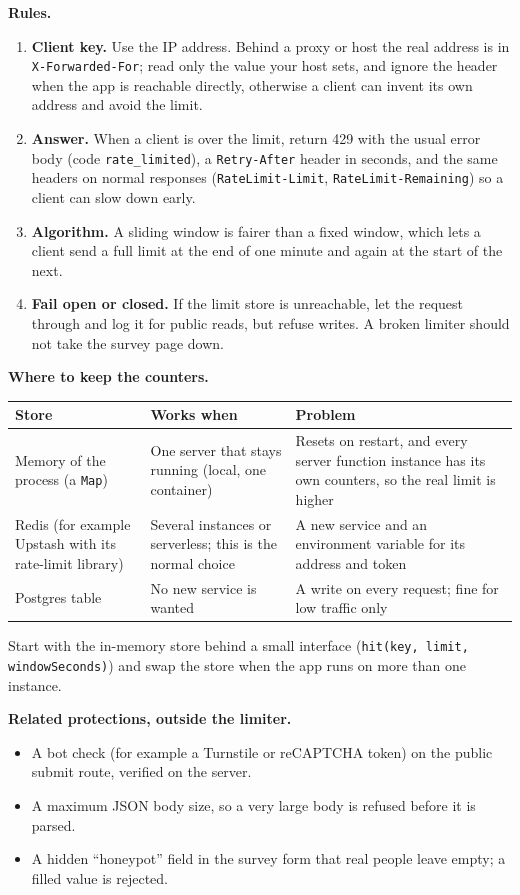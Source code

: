 \documentclass[11pt,a4paper]{article}
\begin{document}
\textbf{Rules.}
\begin{enumerate}
  \item \textbf{Client key.} Use the IP address. Behind a proxy or host the real address is in \texttt{X-Forwarded-For}; read only the value your host sets, and ignore the header when the app is reachable directly, otherwise a client can invent its own address and avoid the limit.
  \item \textbf{Answer.} When a client is over the limit, return 429 with the usual error body (code \texttt{rate\_limited}), a \texttt{Retry-After} header in seconds, and the same headers on normal responses (\texttt{RateLimit-Limit}, \texttt{RateLimit-Remaining}) so a client can slow down early.
  \item \textbf{Algorithm.} A sliding window is fairer than a fixed window, which lets a client send a full limit at the end of one minute and again at the start of the next.
  \item \textbf{Fail open or closed.} If the limit store is unreachable, let the request through and log it for public reads, but refuse writes. A broken limiter should not take the survey page down.
\end{enumerate}

\textbf{Where to keep the counters.}
\begin{center}
\begin{tabular}{@{}p{3.6cm}p{5.4cm}p{5.6cm}@{}}
\toprule
\textbf{Store} & \textbf{Works when} & \textbf{Problem}\\
\midrule
Memory of the process (a \texttt{Map}) & One server that stays running (local, one container) & Resets on restart, and every server function instance has its own counters, so the real limit is higher\\
Redis (for example Upstash with its rate-limit library) & Several instances or serverless; this is the normal choice & A new service and an environment variable for its address and token\\
Postgres table & No new service is wanted & A write on every request; fine for low traffic only\\
\bottomrule
\end{tabular}
\end{center}
Start with the in-memory store behind a small interface (\texttt{hit(key, limit, windowSeconds)}) and swap the store when the app runs on more than one instance.

\textbf{Related protections, outside the limiter.}
\begin{itemize}
  \item A bot check (for example a Turnstile or reCAPTCHA token) on the public submit route, verified on the server.
  \item A maximum JSON body size, so a very large body is refused before it is parsed.
  \item A hidden ``honeypot'' field in the survey form that real people leave empty; a filled value is rejected.
\end{itemize}
\end{document}

